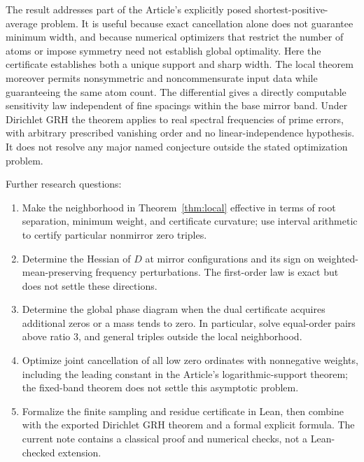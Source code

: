 \documentclass[11pt]{article}
\theoremstyle{remark}\newtheorem{remark}[theorem]{Remark}
\begin{document}
The result addresses part of the Article's explicitly posed shortest-positive-average problem. It is useful because exact cancellation alone does not guarantee minimum width, and because numerical optimizers that restrict the number of atoms or impose symmetry need not establish global optimality. Here the certificate establishes both a unique support and sharp width. The local theorem moreover permits nonsymmetric and noncommensurate input data while guaranteeing the same atom count. The differential gives a directly computable sensitivity law independent of fine spacings within the base mirror band. Under Dirichlet GRH the theorem applies to real spectral frequencies of prime errors, with arbitrary prescribed vanishing order and no linear-independence hypothesis. It does not resolve any major named conjecture outside the stated optimization problem.

Further research questions:
\begin{enumerate}[leftmargin=*]
\item Make the neighborhood in Theorem~\ref{thm:local} effective in terms of root separation, minimum weight, and certificate curvature; use interval arithmetic to certify particular nonmirror zero triples.
\item Determine the Hessian of $D$ at mirror configurations and its sign on weighted-mean-preserving frequency perturbations. The first-order law is exact but does not settle these directions.
\item Determine the global phase diagram when the dual certificate acquires additional zeros or a mass tends to zero. In particular, solve equal-order pairs above ratio $3$, and general triples outside the local neighborhood.
\item Optimize joint cancellation of all low zero ordinates with nonnegative weights, including the leading constant in the Article's logarithmic-support theorem; the fixed-band theorem does not settle this asymptotic problem.
\item Formalize the finite sampling and residue certificate in Lean, then combine with the exported Dirichlet GRH theorem and a formal explicit formula. The current note contains a classical proof and numerical checks, not a Lean-checked extension.
\end{enumerate}
\end{document}
